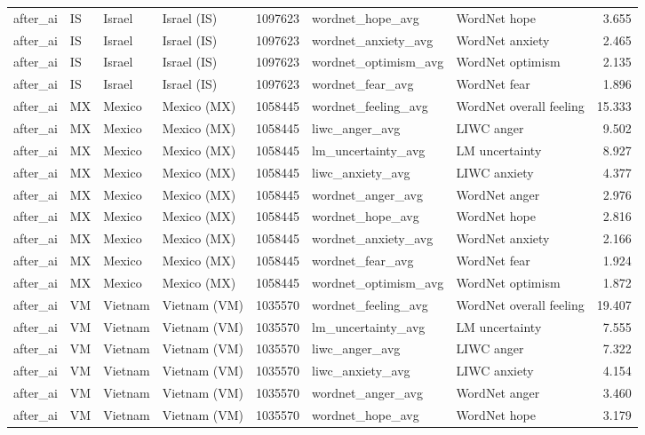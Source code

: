 \begin{tabular}{llllrllr}
after\_ai & IS & Israel & Israel (IS) & 1097623 & wordnet\_hope\_avg & WordNet hope & 3.655 \\
after\_ai & IS & Israel & Israel (IS) & 1097623 & wordnet\_anxiety\_avg & WordNet anxiety & 2.465 \\
after\_ai & IS & Israel & Israel (IS) & 1097623 & wordnet\_optimism\_avg & WordNet optimism & 2.135 \\
after\_ai & IS & Israel & Israel (IS) & 1097623 & wordnet\_fear\_avg & WordNet fear & 1.896 \\
after\_ai & MX & Mexico & Mexico (MX) & 1058445 & wordnet\_feeling\_avg & WordNet overall feeling & 15.333 \\
after\_ai & MX & Mexico & Mexico (MX) & 1058445 & liwc\_anger\_avg & LIWC anger & 9.502 \\
after\_ai & MX & Mexico & Mexico (MX) & 1058445 & lm\_uncertainty\_avg & LM uncertainty & 8.927 \\
after\_ai & MX & Mexico & Mexico (MX) & 1058445 & liwc\_anxiety\_avg & LIWC anxiety & 4.377 \\
after\_ai & MX & Mexico & Mexico (MX) & 1058445 & wordnet\_anger\_avg & WordNet anger & 2.976 \\
after\_ai & MX & Mexico & Mexico (MX) & 1058445 & wordnet\_hope\_avg & WordNet hope & 2.816 \\
after\_ai & MX & Mexico & Mexico (MX) & 1058445 & wordnet\_anxiety\_avg & WordNet anxiety & 2.166 \\
after\_ai & MX & Mexico & Mexico (MX) & 1058445 & wordnet\_fear\_avg & WordNet fear & 1.924 \\
after\_ai & MX & Mexico & Mexico (MX) & 1058445 & wordnet\_optimism\_avg & WordNet optimism & 1.872 \\
after\_ai & VM & Vietnam & Vietnam (VM) & 1035570 & wordnet\_feeling\_avg & WordNet overall feeling & 19.407 \\
after\_ai & VM & Vietnam & Vietnam (VM) & 1035570 & lm\_uncertainty\_avg & LM uncertainty & 7.555 \\
after\_ai & VM & Vietnam & Vietnam (VM) & 1035570 & liwc\_anger\_avg & LIWC anger & 7.322 \\
after\_ai & VM & Vietnam & Vietnam (VM) & 1035570 & liwc\_anxiety\_avg & LIWC anxiety & 4.154 \\
after\_ai & VM & Vietnam & Vietnam (VM) & 1035570 & wordnet\_anger\_avg & WordNet anger & 3.460 \\
after\_ai & VM & Vietnam & Vietnam (VM) & 1035570 & wordnet\_hope\_avg & WordNet hope & 3.179 \\

\end{tabular}
